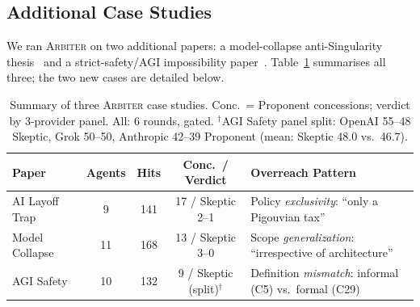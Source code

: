 \documentclass[11pt]{article}
\newcommand{\arbiter}{\textsc{Arbiter}}
\begin{document}
\subsection{Additional Case Studies}
\label{sec:additional_casestudies}

We ran \arbiter{} on two additional papers: a model-collapse anti-Singularity thesis~\cite{selfimprovement2026} and a strict-safety/AGI impossibility paper~\cite{agisafety2026}. Table~\ref{tab:casestudies} summarises all three; the two new cases are detailed below.

\begin{table}[h]
\centering
\caption{Summary of three \arbiter{} case studies. Conc.\ = Proponent concessions; verdict by 3-provider panel. All: 6 rounds, gated. $^\dagger$AGI Safety panel split: OpenAI 55--48 Skeptic, Grok 50--50, Anthropic 42--39 Proponent (mean: Skeptic 48.0 vs.\ 46.7).}
\label{tab:casestudies}
\small
\begin{tabular}{@{}lcccp{4.8cm}@{}}
\toprule
\textbf{Paper} & \textbf{Agents} & \textbf{Hits} & \textbf{Conc.\ / Verdict} & \textbf{Overreach Pattern} \\
\midrule
AI Layoff Trap~\cite{falk2026} & 9 & 141 & 17 / Skeptic 2--1 & Policy \emph{exclusivity}: ``only a Pigouvian tax'' \\[2pt]
Model Collapse~\cite{selfimprovement2026} & 11 & 168 & 13 / Skeptic 3--0 & Scope \emph{generalization}: ``irrespective of architecture'' \\[2pt]
AGI Safety~\cite{agisafety2026} & 10 & 132 & 9 / Skeptic (split)$^\dagger$ & Definition \emph{mismatch}: informal (C5) vs.\ formal (C29) \\
\bottomrule
\end{tabular}
\end{table}
\end{document}
